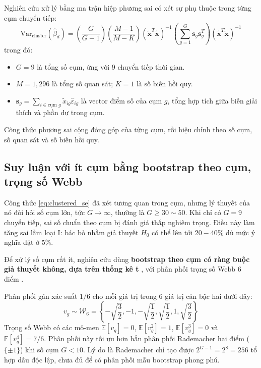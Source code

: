 Nghiên cứu xử lý bằng ma trận hiệp phương sai có xét sự phụ thuộc trong từng cụm chuyển tiếp:
\begin{equation}
\widehat{\text{Var}}_{\text{cluster}}(\widehat{\beta}_d) = \left(\frac{G}{G-1}\right) \left(\frac{M-1}{M-K}\right) \left( \widetilde{\mathbf{x}}^T \widetilde{\mathbf{x}} \right)^{-1} \left( \sum_{g=1}^G \mathbf{s}_g \mathbf{s}_g^T \right) \left( \widetilde{\mathbf{x}}^T \widetilde{\mathbf{x}} \right)^{-1}
\label{eq:clustered_se}
\end{equation}
trong đó:
\begin{itemize}
    \item $G = 9$ là tổng số cụm, ứng với 9 chuyển tiếp thời gian.
    \item $M = 1,296$ là tổng số quan sát; $K = 1$ là số biến hồi quy.
    \item $\mathbf{s}_g = \sum_{i \in \text{cụm } g} \widetilde{x}_{ig} \widehat{\varepsilon}_{ig}$ là vector điểm số của cụm $g$, tổng hợp tích giữa biến giải thích và phần dư trong cụm.
\end{itemize}
Công thức phương sai cộng đóng góp của từng cụm, rồi hiệu chỉnh theo số cụm, số quan sát và số biến hồi quy.
\subsection{Suy luận với ít cụm bằng bootstrap theo cụm, trọng số Webb}
Công thức \eqref{eq:clustered_se} đã xét tương quan trong cụm, nhưng lý thuyết của nó đòi hỏi số cụm lớn, tức $G \to \infty$, thường là $G \ge 30 \sim 50$. Khi chỉ có $G = 9$ chuyển tiếp, sai số chuẩn theo cụm bị đánh giá thấp nghiêm trọng. Điều này làm tăng sai lầm loại I: bác bỏ nhầm giả thuyết $H_0$ có thể lên tới $20-40\%$ dù mức ý nghĩa đặt ở $5\%$.

Để xử lý số cụm rất ít, nghiên cứu dùng \textbf{bootstrap theo cụm có ràng buộc giả thuyết không, dựa trên thống kê t} \cite{cameron2008bootstrap, mackinnon2017wild}, với phân phối trọng số Webb 6 điểm \cite{webb2014reworking}.

\begin{definition}
Phân phối gán xác suất $1/6$ cho mỗi giá trị trong 6 giá trị căn bậc hai dưới đây:
\begin{equation}
v_g \sim \mathcal{W}_6 = \left\{ -\sqrt{\frac{3}{2}}, -1, -\sqrt{\frac{1}{2}}, \sqrt{\frac{1}{2}}, 1, \sqrt{\frac{3}{2}} \right\}
\end{equation}
Trọng số Webb có các mô-men $\mathbb{E}[v_g] = 0$, $\mathbb{E}[v_g^2] = 1$, $\mathbb{E}[v_g^3] = 0$ và $\mathbb{E}[v_g^4] = 7/6$. Phân phối này tối ưu hơn hẳn phân phối Rademacher hai điểm ($\{\pm 1\}$) khi số cụm $G < 10$. Lý do là Rademacher chỉ tạo được $2^{G-1} = 2^8 = 256$ tổ hợp dấu độc lập, chưa đủ để có phân phối mẫu bootstrap phong phú.
\end{definition}

